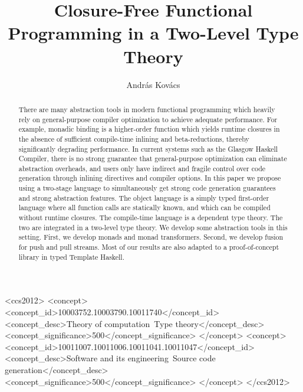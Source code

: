 \documentclass[acmsmall,screen,review,anonymous]{acmart}
\theoremstyle{remark}
\begin{document}
\title{Closure-Free Functional Programming in a Two-Level Type Theory}

\author{András Kovács}

\begin{abstract}
There are many abstraction tools in modern functional programming which heavily
rely on general-purpose compiler optimization to achieve adequate
performance. For example, monadic binding is a higher-order function which
yields runtime closures in the absence of sufficient compile-time inlining and
beta-reductions, thereby significantly degrading performance. In current systems
such as the Glasgow Haskell Compiler, there is no strong guarantee that
general-purpose optimization can eliminate abstraction overheads, and users only
have indirect and fragile control over code generation through inlining
directives and compiler options. In this paper we propose using a two-stage
language to simultaneously get strong code generation guarantees and strong
abstraction features. The object language is a simply typed first-order language
where all function calls are statically known, and which can be compiled without
runtime closures. The compile-time language is a dependent type theory. The two
are integrated in a two-level type theory. We develop some abstraction
tools in this setting. First, we develop monads and monad transformers. Second,
we develop fusion for push and pull streams. Most of our results are also
adapted to a proof-of-concept library in typed Template Haskell.
\end{abstract}

\begin{CCSXML}
<ccs2012>
   <concept>
       <concept_id>10003752.10003790.10011740</concept_id>
       <concept_desc>Theory of computation~Type theory</concept_desc>
       <concept_significance>500</concept_significance>
       </concept>
   <concept>
       <concept_id>10011007.10011006.10011041.10011047</concept_id>
       <concept_desc>Software and its engineering~Source code generation</concept_desc>
       <concept_significance>500</concept_significance>
       </concept>
 </ccs2012>
\end{CCSXML}
\end{document}
